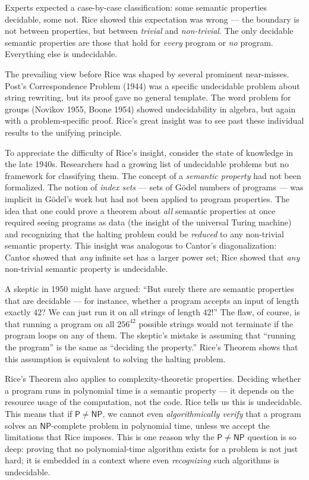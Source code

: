 Experts expected a case-by-case classification: some semantic properties decidable, some not. Rice showed this expectation was wrong --- the boundary is not between properties, but between \emph{trivial} and \emph{non-trivial}. The only decidable semantic properties are those that hold for \emph{every} program or \emph{no} program. Everything else is undecidable.

The prevailing view before Rice was shaped by several prominent near-misses. Post's Correspondence Problem (1944) was a specific undecidable problem about string rewriting, but its proof gave no general template. The word problem for groups (Novikov 1955, Boone 1954) showed undecidability in algebra, but again with a problem-specific proof. Rice's great insight was to see past these individual results to the unifying principle.

To appreciate the difficulty of Rice's insight, consider the state of knowledge in the late 1940s. Researchers had a growing list of undecidable problems but no framework for classifying them. The concept of a \emph{semantic property} had not been formalized. The notion of \emph{index sets} --- sets of G\"odel numbers of programs --- was implicit in G\"odel's work but had not been applied to program properties. The idea that one could prove a theorem about \emph{all} semantic properties at once required seeing programs as data (the insight of the universal Turing machine) and recognizing that the halting problem could be \emph{reduced} to any non-trivial semantic property. This insight was analogous to Cantor's diagonalization: Cantor showed that \emph{any} infinite set has a larger power set; Rice showed that \emph{any} non-trivial semantic property is undecidable.

A skeptic in 1950 might have argued: ``But surely there are semantic properties that are decidable --- for instance, whether a program accepts an input of length exactly 42? We can just run it on all strings of length 42!'' The flaw, of course, is that running a program on all $256^{42}$ possible strings would not terminate if the program loops on any of them. The skeptic's mistake is assuming that ``running the program'' is the same as ``deciding the property.'' Rice's Theorem shows that this assumption is equivalent to solving the halting problem.

Rice's Theorem also applies to complexity-theoretic properties. Deciding whether a program runs in polynomial time is a semantic property --- it depends on the resource usage of the computation, not the code. Rice tells us this is undecidable. This means that if $\mathsf{P} \neq \mathsf{NP}$, we cannot even \emph{algorithmically verify} that a program solves an $\mathsf{NP}$-complete problem in polynomial time, unless we accept the limitations that Rice imposes. This is one reason why the $\mathsf{P} \neq \mathsf{NP}$ question is so deep: proving that no polynomial-time algorithm exists for a problem is not just hard; it is embedded in a context where even \emph{recognizing} such algorithms is undecidable.

